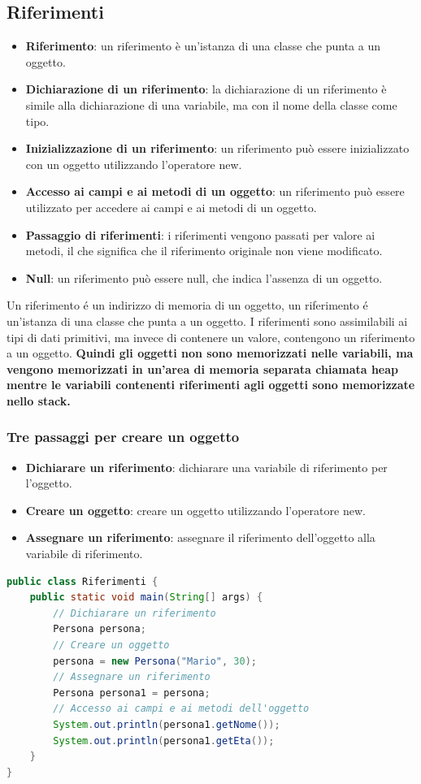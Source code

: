 \documentclass[11pt]{article}
\begin{document}
\subsection{Riferimenti}
\begin{itemize}
    \item \textbf{Riferimento}: un riferimento è un'istanza di una classe che punta a un oggetto.
    \item \textbf{Dichiarazione di un riferimento}: la dichiarazione di un riferimento è simile alla dichiarazione di una variabile, ma con il nome della classe come tipo.
    \item \textbf{Inizializzazione di un riferimento}: un riferimento può essere inizializzato con un oggetto utilizzando l'operatore new.
    \item \textbf{Accesso ai campi e ai metodi di un oggetto}: un riferimento può essere utilizzato per accedere ai campi e ai metodi di un oggetto.
    \item \textbf{Passaggio di riferimenti}: i riferimenti vengono passati per valore ai metodi, il che significa che il riferimento originale non viene modificato.
    \item \textbf{Null}: un riferimento può essere null, che indica l'assenza di un oggetto.
\end{itemize}
Un riferimento é un indirizzo di memoria di un oggetto, un riferimento é un'istanza di una classe che punta a un oggetto.
I riferimenti sono assimilabili ai tipi di dati primitivi, ma invece di contenere un valore, contengono un riferimento a un oggetto.
\textbf{Quindi gli oggetti non sono memorizzati nelle variabili, ma vengono memorizzati in un'area di memoria separata chiamata heap mentre le variabili contenenti riferimenti agli oggetti sono memorizzate nello stack.}
\subsubsection{Tre passaggi per creare un oggetto}
\begin{itemize}
    \item \textbf{Dichiarare un riferimento}: dichiarare una variabile di riferimento per l'oggetto.
    \item \textbf{Creare un oggetto}: creare un oggetto utilizzando l'operatore new.
    \item \textbf{Assegnare un riferimento}: assegnare il riferimento dell'oggetto alla variabile di riferimento.
    \end{itemize}
\begin{lstlisting}[language=Java]
public class Riferimenti {
    public static void main(String[] args) {
        // Dichiarare un riferimento
        Persona persona;
        // Creare un oggetto
        persona = new Persona("Mario", 30);
        // Assegnare un riferimento
        Persona persona1 = persona;
        // Accesso ai campi e ai metodi dell'oggetto
        System.out.println(persona1.getNome());
        System.out.println(persona1.getEta());
    }
}
\end{lstlisting}
\end{document}
